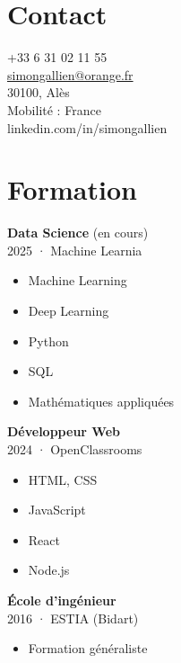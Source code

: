 \documentclass[a4paper,12pt]{article}
\begin{document}
\begin{paracol}{2}

\begin{leftcolumn}
  \begin{minipage}[t][\dimexpr\textheight - 9em\relax][t]{\dimexpr\linewidth}
    \hspace*{1.5em}
    \parbox{\dimexpr\linewidth-1.5em\relax}{

    \section*{Contact}
    \small
    +33 6 31 02 11 55\\
    \href{mailto:simongallien@orange.fr}{simongallien@orange.fr}\\
    30100, Alès\\
    Mobilité : France\\
    linkedin.com/in/simongallien


    \vspace{1em}
    \section*{Formation}
    \textbf{Data Science} (en cours)\\
    \footnotesize 2025 · Machine Learnia 
    \begin{itemize}[leftmargin=1em, nosep]
      \item Machine Learning
      \item Deep Learning
      \item Python
      \item SQL
      \item Mathématiques appliquées\\
    \end{itemize}

    \textbf{Développeur Web}\\
    \footnotesize 2024 · OpenClassrooms
    \begin{itemize}[leftmargin=1em, nosep]
      \item HTML, CSS
      \item JavaScript
      \item React
      \item Node.js\\
    \end{itemize}

    \textbf{École d'ingénieur}\\
    \footnotesize 2016 · ESTIA (Bidart)
    \begin{itemize}[leftmargin=1em, nosep]
      \item Formation généraliste
    \end{itemize}

}
\end{minipage}
\end{leftcolumn}
\end{paracol}
\end{document}
